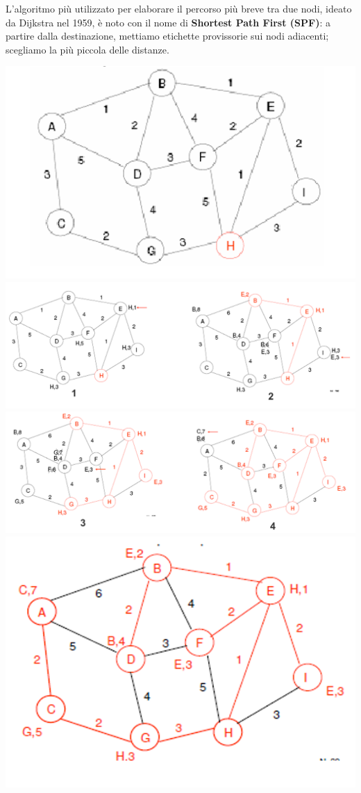             L'algoritmo più utilizzato per elaborare il percorso più breve tra due nodi, ideato da Dijkstra nel 1959, è noto con il nome di \textbf{Shortest Path First (SPF)}: a partire dalla destinazione, mettiamo etichette provissorie sui nodi adiacenti; scegliamo la più piccola delle distanze.

            \begin{center}
                \includegraphics[scale=0.4]{chapters/4/assets/schema_o.png}
                \includegraphics[scale=0.31]{chapters/4/assets/schema_p.png}
                \includegraphics[scale=0.31]{chapters/4/assets/schema_q.png}
                \includegraphics[scale=0.4]{chapters/4/assets/schema_r.png}

\end{center}

